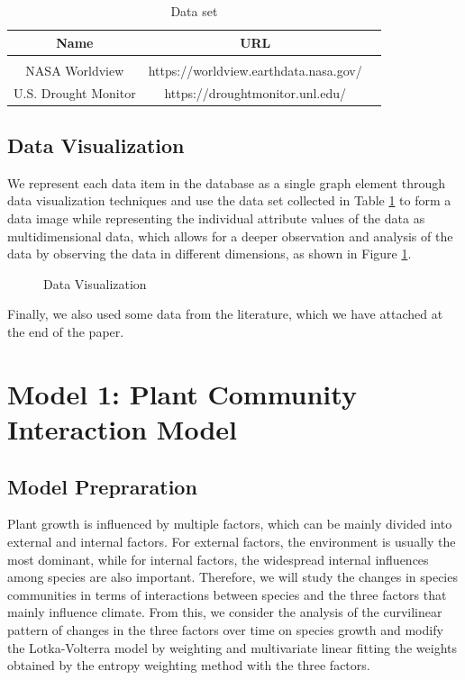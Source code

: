 \documentclass[12pt]{article}
\begin{document}
\begin{table}[htb]
	\centering
	\caption{Data set}
	\begin{tabular}{ccc}
		\toprule
		Name                 & URL                                   \\
		\midrule                                                     \\
		NASA Worldview       & https://worldview.earthdata.nasa.gov/ \\
		U.S. Drought Monitor & https://droughtmonitor.unl.edu/       \\
		\bottomrule
	\end{tabular}
	\label{tab:dataset}
\end{table}

\subsection{Data Visualization}

We represent each data item in the database as a single graph element through data visualization techniques and use the data set collected in Table \ref{tab:dataset} to form a data image while representing the individual attribute values of the data as multidimensional data, which allows for a deeper observation and analysis of the data by observing the data in different dimensions, as shown in Figure \ref{fig:way}.

\begin{figure}[htb]
	\centering
	
	\caption{Data Visualization}
	\label{fig:way}
\end{figure}

Finally, we also used some data from the literature, which we have attached at the end of the paper.

\section{Model 1: Plant Community Interaction Model}

\subsection{Model Prepraration}

Plant growth is influenced by multiple factors, which can be mainly divided into external and internal factors. For external factors, the environment is usually the most dominant, while for internal factors, the widespread internal influences among species are also important. Therefore, we will study the changes in species communities in terms of interactions between species and the three factors that mainly influence climate. From this, we consider the analysis of the curvilinear pattern of changes in the three factors over time on species growth and modify the Lotka-Volterra model by weighting and multivariate linear fitting the weights obtained by the entropy weighting method with the three factors.
\end{document}
